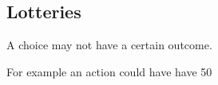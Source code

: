 
\subsection{Lotteries}

A choice may not have a certain outcome.

For example an action could have have 50%



